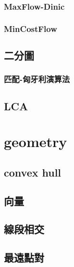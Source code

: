 \subsubsection{MaxFlow-Dinic}


\subsubsection{MinCostFlow}



\subsection{二分圖}

\subsubsection{匹配-匈牙利演算法}




\subsection{LCA}




\section{geometry}
\subsection{convex hull}


\subsection{向量}


\subsection{線段相交}


\subsection{最遠點對}


